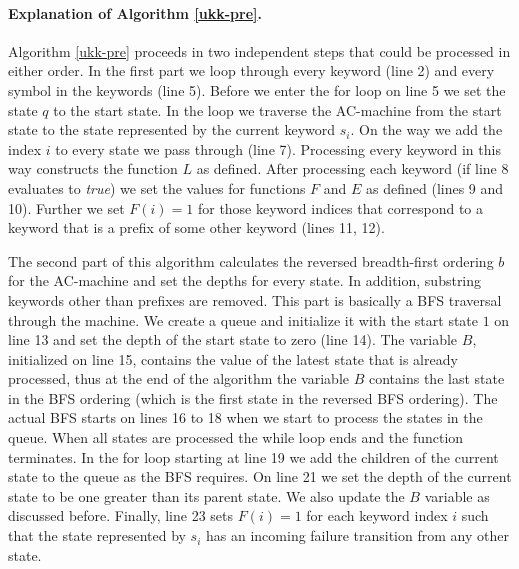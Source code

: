 \documentclass[english,twoside,censored,csm,algorithms-track-2020]{HYthesisML}
\theoremstyle{plain}
\theoremstyle{definition}
\begin{document}
\paragraph{Explanation of Algorithm \ref{ukk-pre}.}  
Algorithm \ref{ukk-pre} proceeds in two independent steps that could be processed in either order.
In the first part we loop through every keyword (line 2) and every symbol in the keywords (line 5).
Before we enter the for loop on line 5 we set the state $q$ to the start state. In the loop
we traverse the AC-machine from the start state to the state represented by the current keyword $s_i$.
On the way we add the index $i$ to every state we pass through (line 7). Processing every keyword in this
way constructs the function $L$ as defined. After processing each keyword (if line 8 evaluates to
\textit{true}) we set the values for functions $F$ and $E$ as defined (lines 9 and 10).
Further we set $F(i) = 1$ for those keyword indices that correspond to a keyword that is a prefix
of some other keyword (lines 11, 12).

The second part of this algorithm calculates the reversed breadth-first ordering $b$ for the
AC-machine and set the depths for every state.
In addition, substring keywords other than
prefixes are removed. This part is basically a BFS traversal through the machine. We create a queue
and initialize it with the start state $1$ on line 13 and set the depth of the start state to
zero (line 14). The variable $B$, initialized on line 15, contains the value of the latest state
that is already processed, thus at the end of the algorithm the variable $B$ contains the last state
in the BFS ordering (which is the first state in the reversed BFS ordering). The actual BFS starts
on lines 16 to 18 when we start to process the states in the queue. When all states are processed
the while loop ends and the function terminates. In the for loop starting at line 19 we add the
children of the current state to the queue as the BFS requires. On line 21 we set the depth
of the current state to be one greater than its parent state. We also update the $B$ variable
as discussed before. Finally, line 23 sets $F(i) = 1$ for each keyword index $i$ such that
the state represented by $s_i$ has an incoming failure transition from any other state.\vspace{0.5cm}
  
\end{document}
